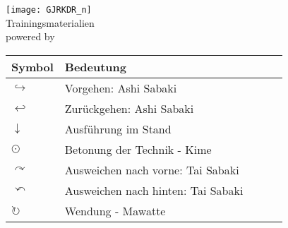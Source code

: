 \setcounter{num}{0}
\setcounter{numz}{0}
\begin{tcolorbox}[colframe=SGL2,colback=white,coltitle=black,title=G\={o}j\={u}-Ry\={u} Karate-D\={o} Langenfeld-Reusrath]
	\begin{center}
		\texttt{[image: GJRKDR\_n]}\\
		Trainingsmaterialien\\{\scriptsize \textsf{powered by} \LaTeXe} 
	\end{center}
\end{tcolorbox}
\clearpage
\pagebreak
\setcounter{num}{0}
\setcounter{numz}{0}	
\begin{tcolorbox}[colframe=SGL2,colback=white,coltitle=black,title=Allgemeines:\indent Erläuterungen]
	\begin{tabularx}{\textwidth}{lllll}
		Symbol	& Bedeutung	& &&\\
		\midrule
		\(\hookrightarrow\) 	& Vorgehen: Ashi Sabaki					& & &\\
		\(\hookleftarrow\) 		& Zurückgehen: Ashi Sabaki				& & &\\
		\(\downarrow\) 			& Ausführung im Stand					& & &\\
		\(\odot\) 				& Betonung der Technik - Kime			& & &\\
		\(\curvearrowright\)	& Ausweichen nach vorne: Tai Sabaki		& & &\\
		\(\curvearrowleft\)		& Ausweichen nach hinten: Tai Sabaki	& & &\\
		\(\circlearrowright\)	& Wendung - Mawatte						& & &\\
	\end{tabularx}
\end{tcolorbox}
\clearpage
\pagebreak
